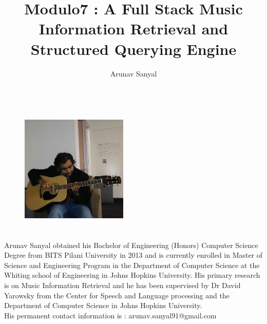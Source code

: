\documentclass[12pt,oneside,final]{thesis}
\begin{document}
\title{Modulo7 : A Full Stack Music Information Retrieval and Structured Querying Engine}
\author{Arunav Sanyal}
\thesis
\masterscience
\copyrightnotice

















\begin{vita}

\begin{figure}
\includegraphics[width=2in,height=2.5in,clip,keepaspectratio]{ArunavSanyal.jpg}
\end{figure}

\noindent Arunav Sanyal obtained his Bachelor of Engineering (Honors) Computer Science Degree from BITS Pilani University in 2013 and is currently enrolled in Master of Science and Engineering Program in the Department of Computer Science at the Whiting school of Engineering in Johns Hopkins University. His primary research is on Music Information Retrieval and he has been supervised by Dr David Yarowsky from the Center for Speech and Language processing and the Department of Computer Science in Johns Hopkins University. \\

\noindent His permanent contact information is : arunav.sanyal91@gmail.com

\end{vita}
\end{document}
